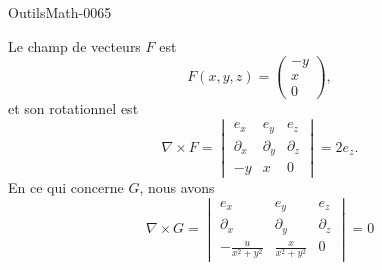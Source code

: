 
\begin{corrige}{OutilsMath-0065}

    Le champ de vecteurs $F$ est 
    \begin{equation}
        F(x,y,z)=\begin{pmatrix}
            -y    \\ 
            x    \\ 
            0    
        \end{pmatrix},
    \end{equation}
    et son rotationnel est
    \begin{equation}
        \nabla\times F=\begin{vmatrix}
            e_x    &  e_y     &   e_z    \\
            \partial_x    &   \partial_y    &   \partial_z    \\
            -y    &   x    &   0
        \end{vmatrix}=2e_z.
    \end{equation}
    En ce qui concerne $G$, nous avons
    \begin{equation}
        \nabla\times G=\begin{vmatrix}
            e_x &   e_y &   e_z \\
            \partial_x  &   \partial_y  &   \partial_z  \\
            -\frac{ u }{ x^2+y^2 }    &   \frac{ x }{ x^2+y^2 }    &   0
        \end{vmatrix}=0
    \end{equation}

\end{corrige}
